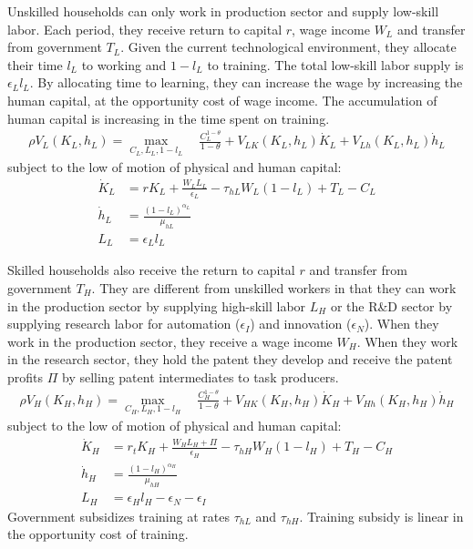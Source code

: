 \documentclass[12pt]{article}
\begin{document}
Unskilled households can only work in production sector and supply low-skill labor. Each period, they receive return to capital $r$, wage income $W_L$ and transfer from government $T_L$. Given the current technological environment, they allocate their time $l_L$ to working and $1-l_L$ to training. The total low-skill labor supply is $\epsilon_Ll_L$. By allocating time to learning, they can increase the wage by increasing the human capital, at the opportunity cost of wage income. The accumulation of human capital is increasing in the time spent on training. 
\begin{align*}
\rho V_L(K_L,h_L) = \max_{C_L,L_L,1-l_L} \quad \frac{C_L^{1-\theta}}{1-\theta}+V_{LK}(K_L,h_L)\dot{K}_L+V_{Lh}(K_L,h_L)\dot{h}_L
\end{align*}
subject to the low of motion of physical and human capital: 
\begin{align*}
\dot{K}_L &=r K_L+\frac{W_LL_L}{\epsilon_L}-\tau_{hL}W_L(1-l_L)+T_L-C_L \\
\dot{h}_L &= \frac{(1-l_L)^{\alpha_L}}{\mu_{hL}} \\
L_L &=\epsilon_L l_L
\end{align*}

Skilled households also receive the return to capital $r$ and transfer from government $T_H$. They are different from unskilled workers in that they can work in the production sector by supplying high-skill labor $L_H$ or the R\&D sector by supplying research labor for automation ($\epsilon_I$) and innovation ($\epsilon_N$). When they work in the production sector, they receive a wage income $W_H$. When they work in the research sector, they hold the patent they develop and receive the patent profits $\Pi$ by selling patent intermediates to task producers.
\begin{align*}
\rho V_H(K_H,h_H) = \max_{C_H,L_H,1-l_H} \quad \frac{C_H^{1-\theta}}{1-\theta}+V_{HK}(K_H,h_H)\dot{K}_H+V_{Hh}(K_H,h_H)\dot{h}_H
\end{align*}
subject to the low of motion of physical and human capital: 
\begin{align*}
\dot{K}_H &= r_t K_H +\frac{W_H L_H+\Pi}{\epsilon_H}-\tau_{hH}W_H(1-l_H)+T_H-C_H \\
\dot{h}_H &= \frac{(1-l_H)^{\alpha_H}}{\mu_{hH}} \\
 L_H&=\epsilon_H l_H-\epsilon_N-\epsilon_I
\end{align*}
Government subsidizes training at rates $\tau_{hL}$ and $\tau_{hH}$. Training subsidy is linear in the opportunity cost of training. 
\end{document}
